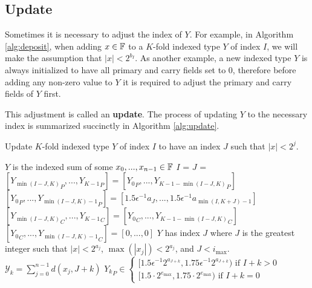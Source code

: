 \subsection{Update}
    \label{sec:primitiveops_update}
    Sometimes it is necessary to adjust the index of $Y$. For example, in Algorithm \ref{alg:deposit}, when adding $x \in \mathbb{F}$ to a $K$-fold
    indexed type $Y$ of index $I$, we will make the assumption that $|x| < 2^{b_I}$.
    As another example, a new indexed type $Y$ is always initialized to have all primary
    and carry fields set to 0, therefore before adding any non-zero value to $Y$
    it is required to adjust the primary and carry fields of $Y$ first.

    This adjustment is called an \textbf{update}.
    The process of updating $Y$ to the necessary index is summarized succinctly
    in Algorithm \ref{alg:update}.

    \begin{samepage}
    \begin{alg}
      Update $K$-fold indexed type $Y$ of index $I$ to have an index $J$ such that $|x| < 2^j$.
      \begin{algorithmic}[1]
        \Require
          \Statex $Y$ is the indexed sum of some $x_0, ..., x_{n - 1} \in \mathbb{F}$
          \State $I$ = 
          \State $J$ = 
            \State $[{Y_{\min(I - J, K)}}_P, ..., {Y_{K - 1}}_P] = [{Y_0}_P, ..., {Y_{K - 1 - \min(I - J, K)}}_P]$
            \State $[{Y_0}_P, ..., {Y_{\min(I - J, K) - 1}}_P] = [1.5  \epsilon^{-1}  a_{J}, ..., 1.5  \epsilon^{-1}  a_{\min(I, K + J) - 1}]$
            \State $[{Y_{\min(I - J, K)}}_C, ..., {Y_{K - 1}}_C] = [{Y_0}_C, ..., {Y_{K - 1 - \min(I - J, K)}}_C]$
            \State $[{Y_0}_C, ..., {Y_{\min(I - J, K) - 1}}_C] = [0, ..., 0]$
          \EndIf
        \EndFunction
        \Ensure
          \Statex $Y$ has index $J$ where $J$ is the greatest integer such that $|x| < 2^{a_j}$, $\max(|x_j|) < 2^{a_j}$, and $J < i_{\max}$.
          \Statex $\mathcal{Y}_k = \sum\limits_{j = 0}^{n - 1} d(x_j, J + k)$
          \Statex ${Y_k}_P \in \begin{cases}[1.5  \epsilon^{-1} 2^{a_{J + k}}, 1.75  \epsilon^{-1} 2^{a_{J + k}}) \text{ if } I + k > 0 \\ [1.5 \cdot 2^{e_{\max}}, 1.75 \cdot 2^{e_{\max}}) \text{ if } I + k = 0\end{cases}$
      \end{algorithmic}
      \label{alg:update}
    \end{alg}
    \end{samepage}

